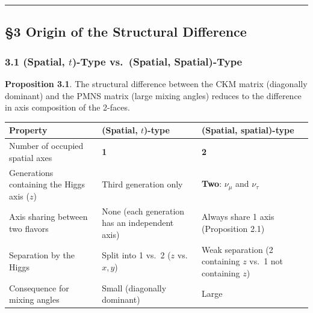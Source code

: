\documentclass[
  a4paper,11pt]{article}
\newcounter{none} %
\begin{document}
\begin{center}\rule{0.5\linewidth}{0.5pt}\end{center}

\subsection{§3 Origin of the Structural
Difference}\label{origin-of-the-structural-difference}

\subsubsection{\texorpdfstring{3.1 (Spatial, \(t\))-Type vs.~(Spatial,
Spatial)-Type}{3.1 (Spatial, t)-Type vs.~(Spatial, Spatial)-Type}}\label{spatial-t-type-vs.-spatial-spatial-type}

\textbf{Proposition 3.1}. The structural difference between the CKM
matrix (diagonally dominant) and the PMNS matrix (large mixing angles)
reduces to the difference in axis composition of the 2-faces.

{\def\LTcaptype{none} %
\begin{longtable}[]{@{}
  >{\raggedright\arraybackslash}p{}
  >{\raggedright\arraybackslash}p{}
  >{\raggedright\arraybackslash}p{}@{}}
\toprule\noalign{}
\begin{minipage}[b]{\linewidth}\raggedright
Property
\end{minipage} & \begin{minipage}[b]{\linewidth}\raggedright
(Spatial, \(t\))-type
\end{minipage} & \begin{minipage}[b]{\linewidth}\raggedright
(Spatial, spatial)-type
\end{minipage} \\
\midrule\noalign{}
\endhead
\bottomrule\noalign{}
\endlastfoot
Number of occupied spatial axes & \textbf{1} & \textbf{2} \\
Generations containing the Higgs axis (\(z\)) & Third generation only &
\textbf{Two}: \(\nu_\mu\) and \(\nu_\tau\) \\
Axis sharing between two flavors & None (each generation has an
independent axis) & Always share 1 axis (Proposition 2.1) \\
Separation by the Higgs & Split into 1 vs.~2 (\(z\) vs.~\(x, y\)) & Weak
separation (2 containing \(z\) vs.~1 not containing \(z\)) \\
Consequence for mixing angles & Small (diagonally dominant) & Large \\
\end{longtable}
}
\end{document}
